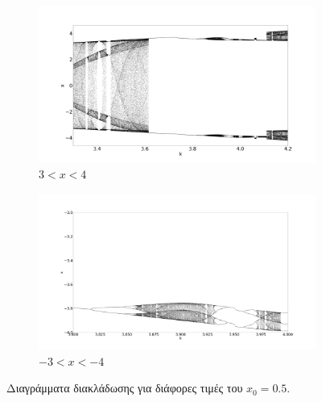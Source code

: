 \begin{figure}[ht]
	\centering	
	\begin{subfigure}[b]{0.8\textwidth}
		\centering
		\includegraphics[width=\textwidth]{LateX images/sine q=-0.5/g7}
		\caption{$3<x<4$}
		\label{f:g522}
	\end{subfigure}
	\hfill
	\begin{subfigure}[b]{0.8\textwidth}
		\centering
		\includegraphics[width=\textwidth]{LateX images/sine q=-0.5/g7.2}
		\caption{$-3<x<-4$}
		\label{f:g523}
	\end{subfigure}
	\caption{Διαγράμματα διακλάδωσης για διάφορες τιμές του $x_0=0.5$. }
\label{f:g238}
\end{figure}

